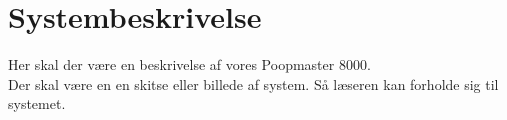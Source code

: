 \chapter{Systembeskrivelse}\label{ch:systembeskrivelse}
Her skal der være en beskrivelse af vores Poopmaster 8000.\\Der skal være en en skitse eller billede af system. Så læseren kan forholde sig til systemet.